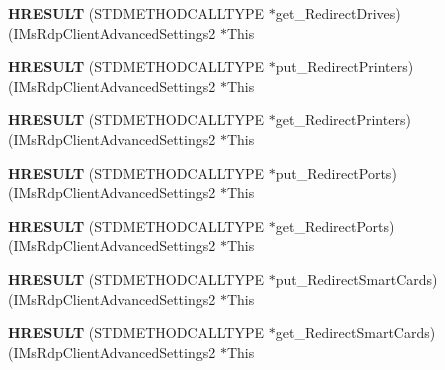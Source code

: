 \begin{DoxyCompactItemize}
{\bfseries H\+R\+E\+S\+U\+LT} (S\+T\+D\+M\+E\+T\+H\+O\+D\+C\+A\+L\+L\+T\+Y\+PE $\ast$get\+\_\+\+Redirect\+Drives)(I\+Ms\+Rdp\+Client\+Advanced\+Settings2 $\ast$This
\item 
\mbox{\label{struct_i_ms_rdp_client_advanced_settings2_vtbl_a802a4672e09078f5c907dc28f019eefc}} 
{\bfseries H\+R\+E\+S\+U\+LT} (S\+T\+D\+M\+E\+T\+H\+O\+D\+C\+A\+L\+L\+T\+Y\+PE $\ast$put\+\_\+\+Redirect\+Printers)(I\+Ms\+Rdp\+Client\+Advanced\+Settings2 $\ast$This
\item 
\mbox{\label{struct_i_ms_rdp_client_advanced_settings2_vtbl_a0be3eae15510c26ea2f0f50634954287}} 
{\bfseries H\+R\+E\+S\+U\+LT} (S\+T\+D\+M\+E\+T\+H\+O\+D\+C\+A\+L\+L\+T\+Y\+PE $\ast$get\+\_\+\+Redirect\+Printers)(I\+Ms\+Rdp\+Client\+Advanced\+Settings2 $\ast$This
\item 
\mbox{\label{struct_i_ms_rdp_client_advanced_settings2_vtbl_a31918999a4333d3b4303096510da6de3}} 
{\bfseries H\+R\+E\+S\+U\+LT} (S\+T\+D\+M\+E\+T\+H\+O\+D\+C\+A\+L\+L\+T\+Y\+PE $\ast$put\+\_\+\+Redirect\+Ports)(I\+Ms\+Rdp\+Client\+Advanced\+Settings2 $\ast$This
\item 
\mbox{\label{struct_i_ms_rdp_client_advanced_settings2_vtbl_a984245411f32c4bbc0f67bb3f750238e}} 
{\bfseries H\+R\+E\+S\+U\+LT} (S\+T\+D\+M\+E\+T\+H\+O\+D\+C\+A\+L\+L\+T\+Y\+PE $\ast$get\+\_\+\+Redirect\+Ports)(I\+Ms\+Rdp\+Client\+Advanced\+Settings2 $\ast$This
\item 
\mbox{\label{struct_i_ms_rdp_client_advanced_settings2_vtbl_a47e7afefd4931bca4445eba33cc61af0}} 
{\bfseries H\+R\+E\+S\+U\+LT} (S\+T\+D\+M\+E\+T\+H\+O\+D\+C\+A\+L\+L\+T\+Y\+PE $\ast$put\+\_\+\+Redirect\+Smart\+Cards)(I\+Ms\+Rdp\+Client\+Advanced\+Settings2 $\ast$This
\item 
\mbox{\label{struct_i_ms_rdp_client_advanced_settings2_vtbl_a189bf30257fe71238ab0ed2df05819fa}} 
{\bfseries H\+R\+E\+S\+U\+LT} (S\+T\+D\+M\+E\+T\+H\+O\+D\+C\+A\+L\+L\+T\+Y\+PE $\ast$get\+\_\+\+Redirect\+Smart\+Cards)(I\+Ms\+Rdp\+Client\+Advanced\+Settings2 $\ast$This
\item 

\end{DoxyCompactItemize}
